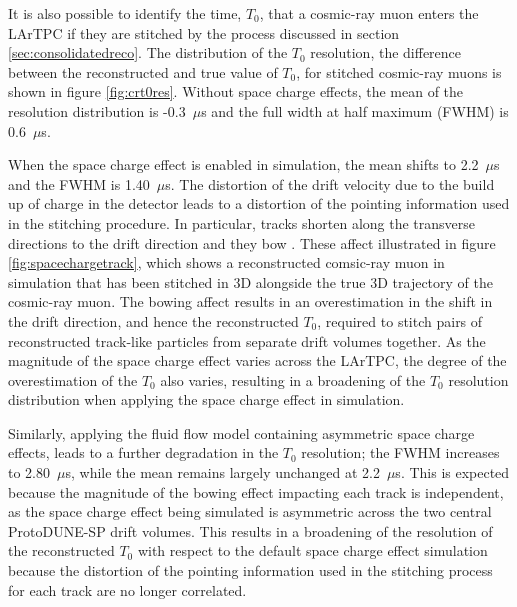 It is also possible to identify the time, $T_{0}$, that a cosmic-ray muon enters the LArTPC if they are stitched by the process discussed in section \ref{sec:consolidatedreco}.  The distribution of the $T_{0}$ resolution, the difference between the reconstructed and true value of $T_{0}$, for stitched cosmic-ray muons is shown in figure \ref{fig:crt0res}.  Without space charge effects, the mean of the resolution distribution is -0.3~$\mu$s and the full width at half maximum (FWHM) is 0.6~$\mu$s.  

When the space charge effect is enabled in simulation, the mean shifts to 2.2~$\mu$s and the FWHM is 1.40~$\mu$s.  The distortion of the drift velocity due to the build up of charge in the detector leads to a distortion of the pointing information used in the stitching procedure.  In particular, tracks shorten along the transverse directions to the drift direction and they bow \cite{spacecharge}.  These affect illustrated in figure \ref{fig:spacechargetrack}, which shows a reconstructed comsic-ray muon in simulation that has been stitched in 3D alongside the true 3D trajectory of the cosmic-ray muon.  The bowing affect results in an overestimation in the shift in the drift direction, and hence the reconstructed $T_{0}$, required to stitch pairs of reconstructed track-like particles from separate drift volumes together.  As the magnitude of the space charge effect varies across the LArTPC, the degree of the overestimation of the $T_{0}$ also varies, resulting in a broadening of the $T_{0}$ resolution distribution when applying the space charge effect in simulation. 

Similarly, applying the fluid flow model containing asymmetric space charge effects, leads to a further degradation in the $T_{0}$ resolution; the FWHM increases to 2.80~$\mu$s, while the mean remains largely unchanged at 2.2~$\mu$s.  This is expected because the magnitude of the bowing effect impacting each track is independent, as the space charge effect being simulated is asymmetric across the two central ProtoDUNE-SP drift volumes.  This results in a broadening of the resolution of the reconstructed $T_{0}$ with respect to the default space charge effect simulation because the distortion of the pointing information used in the stitching process for each track are no longer correlated.

